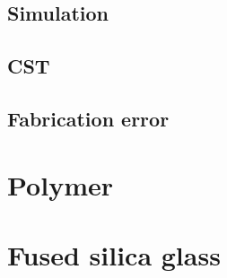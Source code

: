 \begin{figure}[ht]
    \centering
    
    \caption{}
    \label{fig:cl4_params}
\end{figure}



\subsection{Simulation}
\subsection{CST}
\subsection{Fabrication error}

\section{Polymer}

\section{Fused silica glass}



